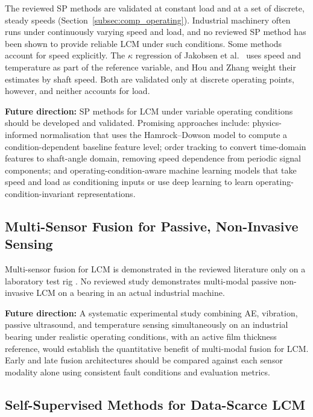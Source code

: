 The reviewed SP methods are validated at constant load and at a set of discrete, steady speeds (Section~\ref{subsec:comp_operating}). Industrial machinery often runs under continuously varying speed and load, and no reviewed SP method has been shown to provide reliable LCM under such conditions. Some methods account for speed explicitly. The $\kappa$ regression of Jakobsen et al.\ \cite{jakobsen_detecting_2023} uses speed and temperature as part of the reference variable, and Hou and Zhang \cite{hou_-situ_2025} weight their estimates by shaft speed. Both are validated only at discrete operating points, however, and neither accounts for load.

\textbf{Future direction:} SP methods for LCM under variable operating conditions should be developed and validated. Promising approaches include: physics-informed normalisation that uses the Hamrock--Dowson model to compute a condition-dependent baseline feature level; order tracking to convert time-domain features to shaft-angle domain, removing speed dependence from periodic signal components; and operating-condition-aware machine learning models that take speed and load as conditioning inputs or use deep learning to learn operating-condition-invariant representations.

\subsection{Multi-Sensor Fusion for Passive, Non-Invasive Sensing}
\label{subsec:gap_fusion}

Multi-sensor fusion for LCM is demonstrated in the reviewed literature only on a laboratory test rig \cite{zhang_graph-data-based_2024}. No reviewed study demonstrates multi-modal passive non-invasive LCM on a bearing in an actual industrial machine.

\textbf{Future direction:} A systematic experimental study combining AE, vibration, passive ultrasound, and temperature sensing simultaneously on an industrial bearing under realistic operating conditions, with an active film thickness reference, would establish the quantitative benefit of multi-modal fusion for LCM. Early and late fusion architectures should be compared against each sensor modality alone using consistent fault conditions and evaluation metrics.

\subsection{Self-Supervised Methods for Data-Scarce LCM}
\label{subsec:gap_ssl}

